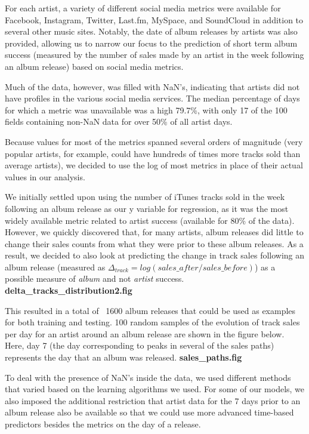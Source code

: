 \documentclass[conference]{IEEEtran}
\begin{document}
For each artist, a variety of different social media metrics were available for Facebook, Instagram, Twitter, Last.fm, MySpace, and SoundCloud in addition to several other music sites. Notably, the date of album releases by artists was also provided, allowing us to narrow our focus to the prediction of short term album success (measured by the number of sales made by an artist in the week following an album release) based on social media metrics.

Much of the data, however, was filled with NaN's, indicating that artists did not have profiles in the various social media services. The median percentage of days for which a metric was unavailable was a high 79.7\%, with only 17 of the 100 fields containing non-NaN data for over 50\% of all artist days.

Because values for most of the metrics spanned several orders of magnitude (very popular artists, for example, could have hundreds of times more tracks sold than average artists), we decided to use the log of most metrics in place of their actual values in our analysis.

We initially settled upon using the number of iTunes tracks sold in the week following an album release as our y variable for regression, as it was the most widely available metric related to artist success (available for 80\% of the data). However, we quickly discovered that, for many artists, album releases did little to change their sales counts from what they were prior to these album releases. As a result, we decided to also look at predicting the change in track sales following an album release (measured as $\Delta_{track} = log(sales\_after/sales\_before)$) as a possible measure of \textit{album} and not \textit{artist} success. \textbf{delta\_tracks\_distribution2.fig}

This resulted in a total of ~1600 album releases that could be used as examples for both training and testing. 100 random samples of the evolution of track sales per day for an artist around an album release are shown in the figure below. Here, day 7 (the day corresponding to peaks in several of the sales paths) represents the day that an album was released. \textbf{sales\_paths.fig}

To deal with the presence of NaN's inside the data, we used different methods that varied based on the learning algorithms we used. For some of our models, we also imposed the additional restriction that artist data for the 7 days prior to an album release also be available so that we could use more advanced time-based predictors besides the metrics on the day of a release.
\end{document}
